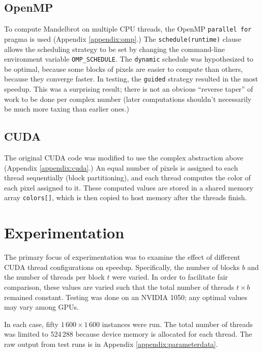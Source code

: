 \documentclass{article}
\begin{document}
    \subsection{OpenMP}
        To compute Mandelbrot on multiple CPU threads, the OpenMP \verb|parallel for| pragma is used (Appendix \ref{appendix:omp}.) The \verb|schedule(runtime)| clause allows the scheduling strategy to be set by changing the command-line environment variable \verb|OMP_SCHEDULE|. The \verb|dynamic| schedule was hypothesized to be optimal, because some blocks of pixels are easier to compute than others, because they converge faster. In testing, the \verb|guided| strategy resulted in the most speedup. This was a surprising result; there is not an obvious ``reverse taper'' of work to be done per complex number (later computations shouldn't necessarily be much more taxing than earlier ones.)

    \subsection{CUDA}
        The original CUDA code was modified to use the complex abstraction above (Appendix \ref{appendix:cuda}.) An equal number of pixels is assigned to each thread sequentially (block partitioning), and each thread computes the color of each pixel assigned to it. These computed values are stored in a shared memory array \verb|colors[]|, which is then copied to host memory after the threads finish.

\section{Experimentation}
    The primary focus of experimentation was to examine the effect of different CUDA thread configurations on speedup. Specifically, the number of blocks $b$ and the number of threads per block $t$ were varied. In order to facilitate fair comparison, these values are varied such that the total number of threads $t \times b$ remained constant. Testing was done on an NVIDIA 1050; any optimal values may vary among GPUs.

    In each case, fifty $1\,600 \times 1\,600$ instances were run. The total number of threads was limited to 524\,288 because device memory is allocated for each thread. The raw output from test runs is in Appendix \ref{appendix:parameterdata}.

    \def\boxit#1{%
      \smash{\fboxsep=0pt\llap{\rlap{\fbox{\strut\makebox[#1]{}}}~}}\ignorespaces
    }
\end{document}
